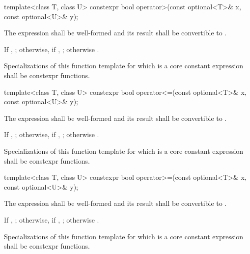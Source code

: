%
\begin{itemdecl}
template<class T, class U> constexpr bool operator>(const optional<T>& x, const optional<U>& y);
\end{itemdecl}

\begin{itemdescr}
\pnum
\requires
The expression  shall be well-formed and
its result shall be convertible to .

\pnum
\returns
If , ;
otherwise, if , ;
otherwise .

\pnum
\remarks
Specializations of this function template
for which  is a core constant expression
shall be constexpr functions.
\end{itemdescr}

%
\begin{itemdecl}
template<class T, class U> constexpr bool operator<=(const optional<T>& x, const optional<U>& y);
\end{itemdecl}

\begin{itemdescr}
\pnum
\requires
The expression  shall be well-formed and
its result shall be convertible to .

\pnum
\returns
If , ;
otherwise, if , ;
otherwise .

\pnum
\remarks
Specializations of this function template
for which  is a core constant expression
shall be constexpr functions.
\end{itemdescr}

%
\begin{itemdecl}
template<class T, class U> constexpr bool operator>=(const optional<T>& x, const optional<U>& y);
\end{itemdecl}

\begin{itemdescr}
\pnum
\requires
The expression  shall be well-formed and
its result shall be convertible to .

\pnum
\returns
If , ;
otherwise, if , ;
otherwise .

\pnum
\remarks
Specializations of this function template
for which  is a core constant expression
shall be constexpr functions.
\end{itemdescr}

